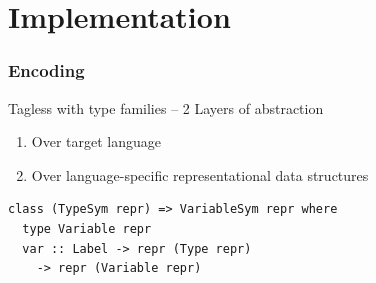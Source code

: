 \documentclass{beamer}
\begin{document}

\section[Implementation]{Implementation}


\begin{frame}[fragile]

\frametitle{Encoding}

Tagless with type families -- 2 Layers of abstraction
\begin{enumerate}
  \item Over target language
  \item Over language-specific representational data structures
\end{enumerate}

\begin{lstlisting}
class (TypeSym repr) => VariableSym repr where
  type Variable repr
  var :: Label -> repr (Type repr)
    -> repr (Variable repr)
\end{lstlisting}

\end{frame}

\end{document}
